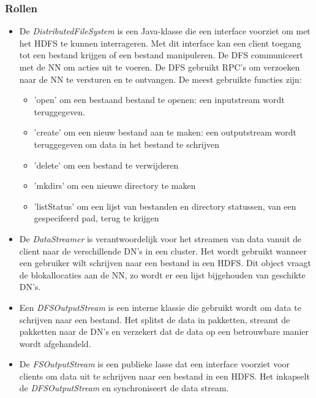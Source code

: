 \documentclass[a4paper,10pt,twoside]{report}
\begin{document}
\subsubsection{Rollen}
\begin{itemize}
	\item De \textit{DistributedFileSystem} is een Java-klasse die een interface voorziet om met het HDFS te kunnen interrageren. Met dit interface kan een client toegang tot een bestand krijgen of een bestand manipuleren. De DFS communiceert met de NN om acties uit te voeren. De DFS gebruikt RPC's om verzoeken naar de NN te versturen en te ontvangen. De meest gebruikte functies zijn: 
	\begin{itemize}
		\item 'open' om een bestaand bestand te openen: een inputstream wordt teruggegeven.
		\item 'create' om een nieuw bestand aan te maken: een outputstream wordt teruggegeven om data in het bestand te schrijven
		\item 'delete' om een bestand te verwijderen
		\item 'mkdirs' om een nieuwe directory te maken
		\item 'listStatus' om een lijst van bestanden en directory statussen, van een gespecifeerd pad, terug te krijgen 
	\end{itemize}
	\item De \textit{DataStreamer} is verantwoordelijk voor het streamen van data vanuit de client naar de verschillende DN's in een cluster. Het wordt gebruikt wanneer een gebruiker wilt schrijven naar een bestand in een HDFS. Dit object vraagt de blokallocaties aan de NN, zo wordt er een lijst bijgehouden van geschikte DN's.
	\item Een \textit{DFSOutputStream} is een interne klassie die gebruikt wordt om data te schrijven naar een bestand. Het splitst de data in pakketten, streamt de pakketten naar de DN's en verzekert dat de data op een betrouwbare manier wordt afgehandeld.
	\item De \textit{FSOutputStream} is een publieke lasse dat een interface voorziet voor clients om data uit te schrijven naar een bestand in een HDFS. Het inkapselt de \textit{DFSOutputStream} en synchroniseert de data stream.
\end{itemize}
\end{document}

